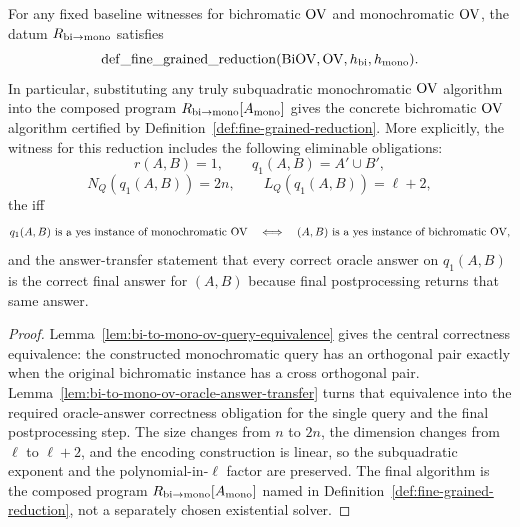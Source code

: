 \begin{lemma}
  \label{lem:bi-to-mono-ov-fine-grained-reduction}
  For any fixed baseline witnesses for bichromatic $\mathrm{OV}$ and monochromatic
  $\mathrm{OV}$, the datum $R_{\rm bi\to mono}$ satisfies
  \[
    \operatorname{def\_fine\_grained\_reduction}
      (\operatorname{BiOV},\mathrm{OV},h_{\rm bi},h_{\rm mono}).
  \]
  In particular, substituting any truly subquadratic monochromatic $\mathrm{OV}$
  algorithm into the composed program
  $R_{\rm bi\to mono}[A_{\rm mono}]$ gives the concrete bichromatic $\mathrm{OV}$
  algorithm certified by Definition~\ref{def:fine-grained-reduction}.  More
  explicitly, the witness for this reduction includes the following eliminable
  obligations:
  \[
    r(A,B)=1,\qquad q_1(A,B)=A'\cup B',
  \]
  \[
    N_Q(q_1(A,B))=2n,\qquad L_Q(q_1(A,B))=\ell+2,
  \]
  the iff
  \[
    q_1(A,B)\text{ is a yes instance of monochromatic }\mathrm{OV}
    \quad\Longleftrightarrow\quad
    (A,B)\text{ is a yes instance of bichromatic }\mathrm{OV},
  \]
  and the answer-transfer statement that every correct oracle answer on
  $q_1(A,B)$ is the correct final answer for $(A,B)$ because final
  postprocessing returns that same answer.
\end{lemma}
\begin{proof}
  Lemma~\ref{lem:bi-to-mono-ov-query-equivalence} gives the central
  correctness equivalence: the constructed monochromatic query has an
  orthogonal pair exactly when the original bichromatic instance has a cross
  orthogonal pair.  Lemma~\ref{lem:bi-to-mono-ov-oracle-answer-transfer}
  turns that equivalence into the required oracle-answer correctness
  obligation for the single query and the final postprocessing step.  The size
  changes
  from $n$ to $2n$, the dimension changes from $\ell$ to $\ell+2$, and the
  encoding construction is linear, so the subquadratic exponent and the
  polynomial-in-$\ell$ factor are preserved.  The final algorithm is the
  composed program $R_{\rm bi\to mono}[A_{\rm mono}]$ named in
  Definition~\ref{def:fine-grained-reduction}, not a separately chosen
  existential solver.
\end{proof}

